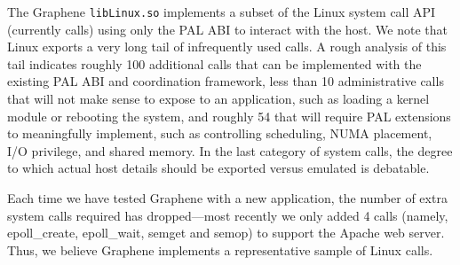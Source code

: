 


\vspace{5pt}
The Graphene {\tt libLinux.so} implements a subset 
of the Linux system call API (currently \syscalls{} calls)
using only the PAL ABI to interact with the host.
We note that Linux exports a very long tail of infrequently used calls.
A rough analysis of this tail indicates roughly 100 additional calls that can be implemented
with the existing PAL ABI and coordination framework, less than 10 administrative calls that will not make sense to expose to 
an application, such as loading a kernel module or rebooting the system, and roughly 54 that will require 
PAL extensions to meaningfully implement, such as controlling scheduling,
NUMA placement, I/O privilege, and shared memory.
In the last category of system calls, the degree to which actual host details should be exported versus emulated is debatable.

Each time we have tested Graphene with a new application, the number of extra system calls
required has dropped---most recently we only added 4 calls
(namely, epoll\_create, epoll\_wait, semget and semop)
to support the Apache web server.
Thus, we believe Graphene implements a representative sample of Linux calls.



